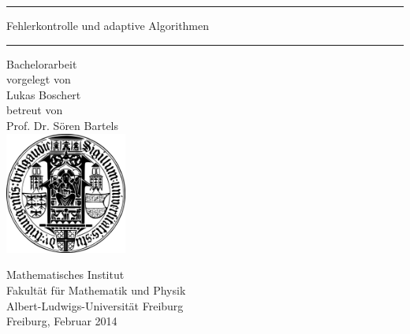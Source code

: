 \thispagestyle{empty}
\mbox{}
\begin{center}
\vspace*{2cm}
\hrule \vspace*{4mm}
{\huge \textsf{Fehlerkontrolle und adaptive Algorithmen}} \\[3mm]
\hrule \vspace*{3cm}
{\sc \huge Bachelorarbeit} \\[1cm]
vorgelegt von \\[.5cm]
{\Large Lukas Boschert} \\[1cm]
betreut von \\[.5cm]
{\Large Prof. Dr. S\"oren Bartels} \\[1.5cm]
\includegraphics[width=4cm]{pics/alu-wappen}

\bigskip

{\sc Mathematisches Institut} \\
{\sc Fakult\"at f\"ur Mathematik und Physik} \\
{\sc Albert-Ludwigs-Universit\"at Freiburg} \\[1cm]
{\Large Freiburg, Februar 2014}

\end{center}
\mbox{}

\newpage
\thispagestyle{empty}
\mbox{}

